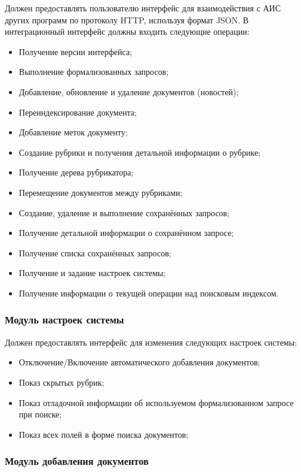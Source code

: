 \documentclass[russian,utf8,emptystyle]{eskdtext}
\begin{document}
Должен предоставлять пользователю интерфейс для взаимодействия с АИС других программ по протоколу HTTP, используя формат JSON. В интеграционный интерфейс должны входить следующие операции:
\begin{itemize}
\item Получение версии интерфейса;
\item Выполнение формализованных запросов;
\item Добавление, обновление и удаление документов (новостей);
\item Переиндексирование документа;
\item Добавление меток документу;
\item Создание рубрики и получения детальной информации о рубрике;
\item Получение дерева рубрикатора;
\item Перемещение документов между рубриками;
\item Создание, удаление и выполнение сохранённых запросов;
\item Получение детальной информации о сохранённом запросе;
\item Получение списка сохранённых запросов;
\item Получение и задание настроек системы;
\item Получение информации о текущей операции над поисковым индексом.
\end{itemize}

\subsubsection{Модуль настроек системы}
Должен предоставлять интерфейс для изменения следующих настроек системы:
\begin{itemize}
\item Отключение/Включение автоматического добавления документов;
\item Показ скрытых рубрик;
\item Показ отладочной информации об используемом формализованном запросе при поиске;
\item Показ всех полей в форме поиска документов;
\end{itemize}

\subsubsection{Модуль добавления документов}
\end{document}
